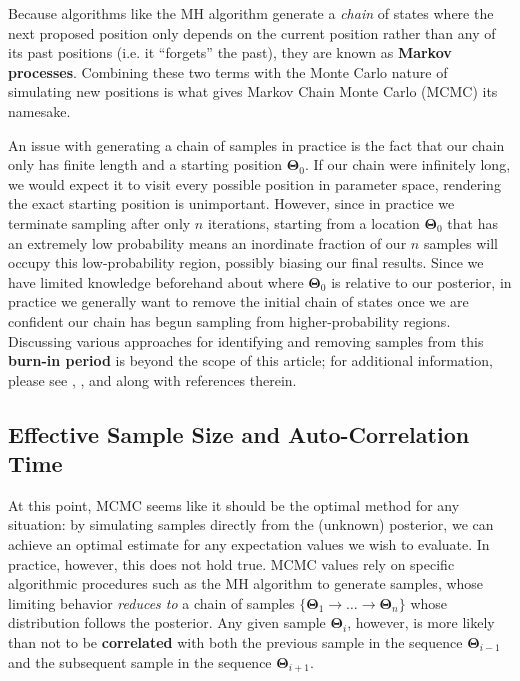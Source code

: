 \documentclass[12pt, titlepage]{article}
\newcommand{\params}{\ensuremath{\boldsymbol\Theta}}
\begin{document}
Because algorithms like the MH algorithm generate a \textit{chain} of states where the
next proposed position only depends on the current position rather than
any of its past positions (i.e. it ``forgets'' the past),
they are known as \textbf{Markov processes}.
Combining these two terms with the Monte Carlo nature of simulating new
positions is what gives Markov Chain Monte Carlo (MCMC) its namesake.

An issue with generating a chain of samples in practice is the
fact that our chain only has finite length and a starting position $\params_0$. 
If our chain were infinitely long, we would expect it
to visit every possible position in parameter space, rendering
the exact starting position is unimportant. However, since in practice we terminate 
sampling after only $n$ iterations, starting from a location $\params_0$ that has
an extremely low probability means an inordinate fraction
of our $n$ samples will occupy this low-probability region, possibly biasing
our final results. Since we have limited knowledge beforehand about where
$\params_0$ is relative to our posterior, 
in practice we generally want to remove the initial
chain of states once we are confident our chain has begun sampling from
higher-probability regions. Discussing various approaches
for identifying and removing samples from this \textbf{burn-in period} 
is beyond the scope of this article; for additional information,
please see \citet{gelmanrubin92}, \citet{gelman+13}, 
and \citet{vehtari+19} along with references therein.

\subsection{Effective Sample Size and Auto-Correlation Time} \label{subsec:autocorr}

At this point, MCMC seems like it should be the optimal method for
any situation: by simulating samples directly from the (unknown) posterior,
we can achieve an optimal estimate for any expectation values we wish
to evaluate. In practice, however, this does not hold true.
MCMC values rely on specific algorithmic procedures such as 
the MH algorithm to generate samples,
whose limiting behavior \textit{reduces to} a chain of samples
$\{ \params_1 \rightarrow \dots \rightarrow \params_n \}$
whose distribution follows the posterior. Any given sample $\params_i$,
however, is more likely than not to be 
\textbf{correlated} with both the previous sample in the 
sequence $\params_{i-1}$ and the subsequent sample in the sequence
$\params_{i+1}$.
\end{document}
